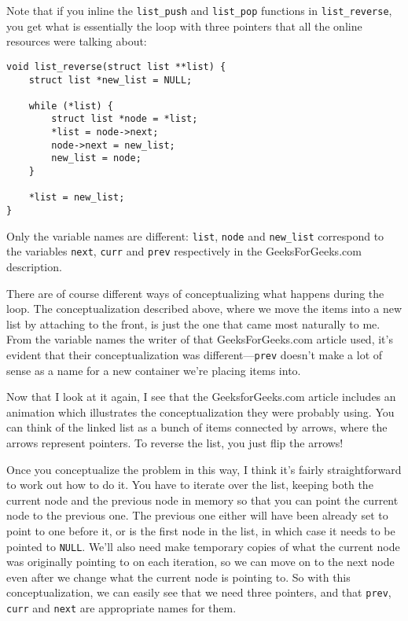 \documentclass{amsart}
\begin{document}
Note that if you inline the {\tt list\_push} and {\tt list\_pop} functions in {\tt list\_reverse}, you get what is essentially the loop with three pointers that all the online resources were talking about:

\begin{verbatim}
void list_reverse(struct list **list) {
    struct list *new_list = NULL;
    
    while (*list) {
        struct list *node = *list;
        *list = node->next;
        node->next = new_list;
        new_list = node;
    }
    
    *list = new_list;
}
\end{verbatim}

Only the variable names are different: {\tt *list}, {\tt node} and {\tt new\_list} correspond to the variables {\tt next}, {\tt curr} and {\tt prev} respectively in the GeeksForGeeks.com description.

There are of course different ways of conceptualizing what happens during the loop. The conceptualization described above, where we move the items into a new list by attaching to the front, is just the one that came most naturally to me. From the variable names the writer of that GeeksForGeeks.com article used, it's evident that their conceptualization was different---{\tt prev} doesn't make a lot of sense as a name for a new container we're placing items into.

Now that I look at it again, I see that the GeeksforGeeks.com article includes an animation which illustrates the conceptualization they were probably using. You can think of the linked list as a bunch of items connected by arrows, where the arrows represent pointers. To reverse the list, you just flip the arrows!

Once you conceptualize the problem in this way, I think it's fairly straightforward to work out how to do it. You have to iterate over the list, keeping both the current node and the previous node in memory so that you can point the current node to the previous one. The previous one either will have been already set to point to one before it, or is the first node in the list, in which case it needs to be pointed to {\tt NULL}. We'll also need make temporary copies of what the current node was originally pointing to on each iteration, so we can move on to the next node even after we change what the current node is pointing to. So with this conceptualization, we can easily see that we need three pointers, and that {\tt prev}, {\tt curr} and {\tt next} are appropriate names for them.
\end{document}
